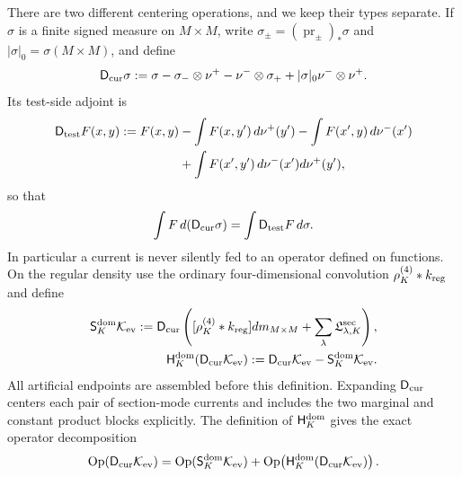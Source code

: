 \documentclass[11pt]{article}
\begin{document}
There are two different centering operations, and we keep their types
separate.  If $\sigma$ is a finite signed measure on $M\times M$, write
$\sigma_\pm=(\operatorname{pr}_\pm)_*\sigma$ and
$|\sigma|_0=\sigma(M\times M)$, and define
\begin{equation}
\label{eq:current-centering}
 \mathsf D_{\rm cur}\sigma
 :=\sigma-\sigma_-\otimes\nu^+-\nu^-\otimes\sigma_+
       +|\sigma|_0\nu^-\otimes\nu^+.
\end{equation}
Its test-side adjoint is
\begin{align}
 \mathsf D_{\rm test}F(x,y)
 :=F(x,y)&-\int F(x,y')\,d\nu^+(y')
          -\int F(x',y)\,d\nu^-(x') \notag\\
 &+\int F(x',y')\,d\nu^-(x')d\nu^+(y'),
 \label{eq:test-centering}
\end{align}
so that
\begin{equation}
 \label{eq:centering-adjoint-identity}
 \int F\,d(\mathsf D_{\rm cur}\sigma)
 =\int \mathsf D_{\rm test}F\,d\sigma.
\end{equation}
In particular a current is never silently fed to an operator defined on
functions.  On the regular density use the ordinary
four-dimensional convolution $\rho_K^{(4)}*k_{\rm reg}$ and define
\begin{align}
\label{eq:dominant-centered-smoother}
\mathsf S_K^{\rm dom}\mathcal K_{\rm ev}:=
 \mathsf D_{\rm cur}\left(
 [\rho_K^{(4)}*k_{\rm reg}]dm_{M\times M}
 +\sum_\lambda\mathfrak L^{\rm sec}_{\lambda,K}\right),
 \notag\\
 \mathsf H_K^{\rm dom}(\mathsf D_{\rm cur}\mathcal K_{\rm ev}):=
 \mathsf D_{\rm cur}\mathcal K_{\rm ev}-
 \mathsf S_K^{\rm dom}\mathcal K_{\rm ev}.
\end{align}
All artificial endpoints are assembled before this definition.  Expanding
$\mathsf D_{\rm cur}$ centers each pair of section-mode currents and includes
the two marginal and constant product blocks explicitly.
The definition of $\mathsf H_K^{\rm dom}$ gives the exact operator decomposition
\begin{equation}
\label{eq:current-operator-low-high-identity}
 \operatorname{Op}(\mathsf D_{\rm cur}\mathcal K_{\rm ev})
 =\operatorname{Op}(\mathsf S_K^{\rm dom}\mathcal K_{\rm ev})
  +\operatorname{Op}\!\left(
       \mathsf H_K^{\rm dom}(\mathsf D_{\rm cur}\mathcal K_{\rm ev})\right).
\end{equation}
\end{document}

